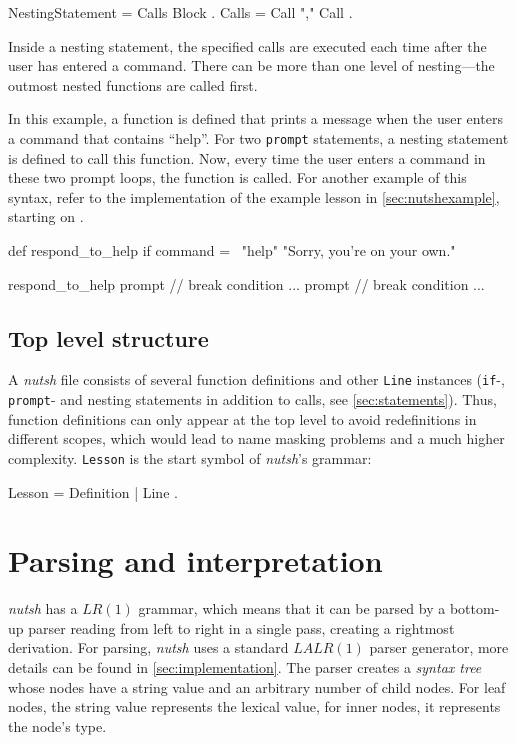 \documentclass[paper=a4,abstract=on,cleardoublepage=empty,numbers=noenddot,toc=bib,12pt,appendixprefix=true]{scrreprt}
\begin{document}
\begin{ebnf}
NestingStatement = Calls Block .
Calls = Call { "," Call } .
\end{ebnf}
%
Inside a nesting statement, the specified calls are executed each time after the user has entered a command. There can be more than one level of nesting---the outmost nested functions are called first.

In this example, a function is defined that prints a message when the user enters a command that contains “help”. For two \texttt{prompt} statements, a nesting statement is defined to call this function. Now, every time the user enters a command in these two prompt loops, the function is called. For another example of this syntax, refer to the implementation of the example lesson in \cref{sec:nutshexample}, starting on .

\begin{nutsh}
def respond_to_help {
    if command =~ "help" {
        "Sorry, you're on your own."
    }
}

respond_to_help {
    prompt {
        // break condition ...
    }
    prompt {
        // break condition ...
    }
}
\end{nutsh}

\subsection{Top level structure}

A \emph{nutsh} file consists of several function definitions and other \texttt{Line} instances (\texttt{if}-, \texttt{prompt}- and nesting statements in addition to calls, see \cref{sec:statements}). Thus, function definitions can only appear at the top level to avoid redefinitions in different scopes, which would lead to name masking problems and a much higher complexity. \texttt{Lesson} is the start symbol of \emph{nutsh}'s grammar:

\begin{ebnf}
Lesson = { Definition | Line } .
\end{ebnf}

\section{Parsing and interpretation}

\emph{nutsh} has a $LR(1)$ grammar, which means that it can be parsed by a bottom-up parser reading from left to right in a single pass, creating a rightmost derivation. For parsing, \emph{nutsh} uses a standard $LALR(1)$ parser generator, more details can be found in \cref{sec:implementation}.
The parser creates a \emph{syntax tree} whose nodes have a string value and an arbitrary number of child nodes. For leaf nodes, the string value represents the lexical value, for inner nodes, it represents the node's type.
\end{document}
